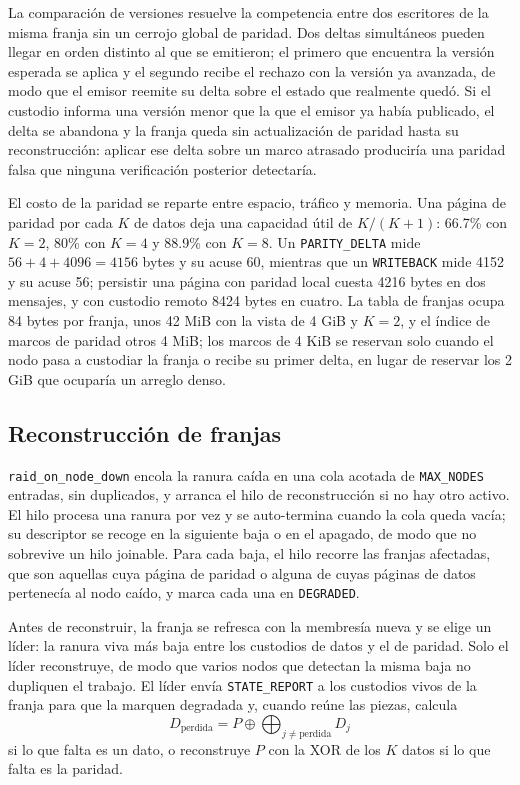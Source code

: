 La comparación de versiones resuelve la competencia entre dos escritores de la misma franja sin un cerrojo global de paridad. Dos deltas simultáneos pueden llegar en orden distinto al que se emitieron; el primero que encuentra la versión esperada se aplica y el segundo recibe el rechazo con la versión ya avanzada, de modo que el emisor reemite su delta sobre el estado que realmente quedó. Si el custodio informa una versión menor que la que el emisor ya había publicado, el delta se abandona y la franja queda sin actualización de paridad hasta su reconstrucción: aplicar ese delta sobre un marco atrasado produciría una paridad falsa que ninguna verificación posterior detectaría.

El costo de la paridad se reparte entre espacio, tráfico y memoria. Una página de paridad por cada $K$ de datos deja una capacidad útil de $K/(K+1)$: 66.7\% con $K=2$, 80\% con $K=4$ y 88.9\% con $K=8$. Un \texttt{PARITY\_DELTA} mide $56 + 4 + 4096 = 4156$ bytes y su acuse 60, mientras que un \texttt{WRITEBACK} mide 4152 y su acuse 56; persistir una página con paridad local cuesta 4216 bytes en dos mensajes, y con custodio remoto 8424 bytes en cuatro. La tabla de franjas ocupa 84 bytes por franja, unos 42 MiB con la vista de 4 GiB y $K=2$, y el índice de marcos de paridad otros 4 MiB; los marcos de 4 KiB se reservan solo cuando el nodo pasa a custodiar la franja o recibe su primer delta, en lugar de reservar los 2 GiB que ocuparía un arreglo denso.

\subsection{Reconstrucción de franjas}

\texttt{raid\_on\_node\_down} encola la ranura caída en una cola acotada de \texttt{MAX\_NODES} entradas, sin duplicados, y arranca el hilo de reconstrucción si no hay otro activo. El hilo procesa una ranura por vez y se auto-termina cuando la cola queda vacía; su descriptor se recoge en la siguiente baja o en el apagado, de modo que no sobrevive un hilo joinable. Para cada baja, el hilo recorre las franjas afectadas, que son aquellas cuya página de paridad o alguna de cuyas páginas de datos pertenecía al nodo caído, y marca cada una en \texttt{DEGRADED}.

Antes de reconstruir, la franja se refresca con la membresía nueva y se elige un líder: la ranura viva más baja entre los custodios de datos y el de paridad. Solo el líder reconstruye, de modo que varios nodos que detectan la misma baja no dupliquen el trabajo. El líder envía \texttt{STATE\_REPORT} a los custodios vivos de la franja para que la marquen degradada y, cuando reúne las piezas, calcula
\begin{equation}
D_{\text{perdida}} = P \oplus \bigoplus_{j \ne \text{perdida}} D_j
\end{equation}
si lo que falta es un dato, o reconstruye $P$ con la XOR de los $K$ datos si lo que falta es la paridad.

